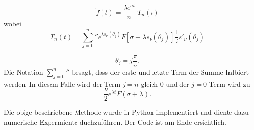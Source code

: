 \begin{equation}
\tilde{f}(t) = \frac{\lambda e^{\sigma t}}{n}~T_{n}(t)
\end{equation}
wobei 
\begin{equation}
T_{n}(t)
=
{\sum_{j=0}^n}'' e^{\lambda s_{\nu}(\theta_{j})}
F[\sigma + \lambda s_{\nu}(\theta_{j})]
\frac{1}{i} s'_{\nu}(\theta_{j})
\end{equation}

\begin{equation}
\theta_{j} = j \frac{\pi}{n}.
\end{equation}
Die Notation ${\sum_{j=0}^n}''$ besagt, dass der erste und letzte
Term der Summe halbiert werden.
In diesem Falle wird der Term $j=n$ gleich 0 und der $j=0$ Term wird zu
\begin{equation}
\frac{\nu}{2}e^{\lambda t}F(\sigma + \lambda).
\end{equation}


Die obige beschriebene Methode wurde in Python implementiert und diente dazu numerische Expermiente duchzuführen. Der Code ist am Ende ersichtlich. 


